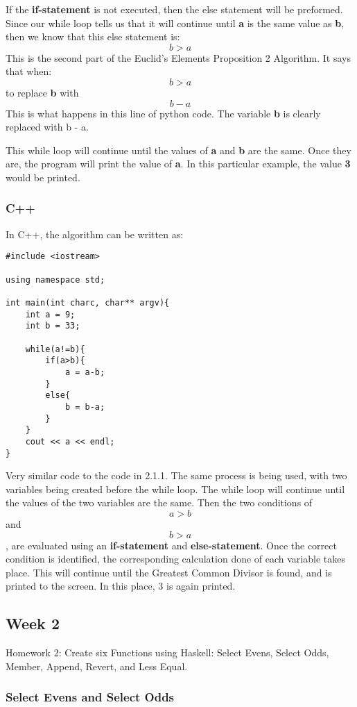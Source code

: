 \documentclass{article}
\theoremstyle{theorem}
\theoremstyle{definition}
\theoremstyle{remark}
\begin{document}
\noindent If the \textbf{if-statement} is not executed, then the else statement will be preformed. Since our while loop tells us that it will continue until \textbf{a} is the same value as \textbf{b}, then we know that this else statement is: \[b > a\]This is the second part of the Euclid's Elements Proposition 2 Algorithm. It says that when: \[b > a\] to replace \textbf{b} with \[b - a\]This is what happens in this line of python code. The variable \textbf{b} is clearly replaced with b - a. \medskip\noindent

\noindent This while loop will continue until the values of \textbf{a} and \textbf{b} are the same. Once they are, the program will print the value of \textbf{a}. In this particular example, the value \textbf{3} would be printed.

\subsubsection{C++}
In C++, the algorithm can be written as:
\begin{verbatim}
#include <iostream>

using namespace std;

int main(int charc, char** argv){
    int a = 9;
    int b = 33;

    while(a!=b){
        if(a>b){
            a = a-b;
        }
        else{
            b = b-a;
        }
    }
    cout << a << endl;
}
\end{verbatim}
Very similar code to the code in 2.1.1. The same process is being used, with two variables being created before the while loop. The while loop will continue until the values of the two variables are the same. Then the two conditions of \[a > b\] and \[b > a\], are evaluated using an \textbf{if-statement} and \textbf{else-statement}. Once the correct condition is identified, the corresponding calculation done of each variable takes place. This will continue until the Greatest Common Divisor is found, and is printed to the screen. In this place, 3 is again printed.

\subsection{Week 2}

Homework 2: Create six Functions using Haskell: Select Evens, Select Odds, Member, Append, Revert, and Less Equal.

\subsubsection{Select Evens and Select Odds}
\end{document}
